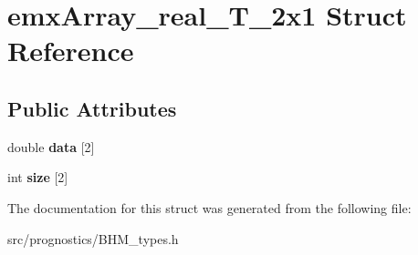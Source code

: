 \hypertarget{structemxArray__real__T__2x1}{}\section{emx\+Array\+\_\+real\+\_\+\+T\+\_\+2x1 Struct Reference}
\label{structemxArray__real__T__2x1}
\subsection*{Public Attributes}
\begin{DoxyCompactItemize}
\item 
\mbox{\label{structemxArray__real__T__2x1_a4e856deac59444005120cbd97f4377e7}} 
double {\bfseries data} \mbox{[}2\mbox{]}
\item 
\mbox{\label{structemxArray__real__T__2x1_af3a59c2397134ba601adb1fd6450cc7a}} 
int {\bfseries size} \mbox{[}2\mbox{]}
\end{DoxyCompactItemize}


The documentation for this struct was generated from the following file\+:\begin{DoxyCompactItemize}
\item 
src/prognostics/B\+H\+M\+\_\+types.\+h\end{DoxyCompactItemize}
